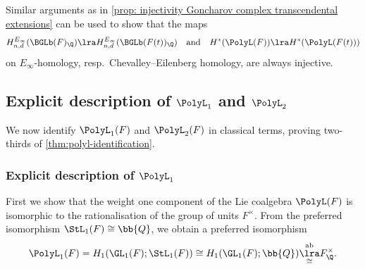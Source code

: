 \documentclass[a4paper]{amsart}
\begin{document}
\begin{remark}
    Similar arguments as in \cref{prop: injectivity Goncharov complex transcendental extensions} can be used to show that the maps
    \[H_{n,d}^{E_\infty}(\BGLb(F)_\Q) \lra H_{n,d}^{E_\infty}(\BGLb(F(t))_\Q) \quad \text{and} \quad H^*(\PolyL(F)) \lra H^*(\PolyL(F(t))) \]
on $E_\infty$-homology, resp.~Chevalley--Eilenberg homology, are always injective.
\end{remark}

\subsection{Explicit description of  $\PolyL_1$ and  $\PolyL_2$}\label{sec: G1 and G_2} We now identify $\PolyL_1(F)$ and $\PolyL_2(F)$ in classical terms, proving two-thirds of \cref{thm:polyl-identification}.

\subsubsection{Explicit description of  $\PolyL_1$}
First we show that the weight one component of the Lie coalgebra $\PolyL(F)$ is isomorphic to the rationalisation of the group of units $F^\times$. From the preferred isomorphism $\StL_1(F) \cong \bb{Q}$, we obtain a preferred isomorphism
\begin{equation}\label{eqn:isomorphism in weight 1}
    \PolyL_1(F) = H_1(\GL_1(F);\StL_1(F))\cong H_1(\GL_1(F);\bb{Q}) \underset{\cong}{\overset{\rm{ab}}\lra} F^{\times}_{\Q}.
\end{equation}
\end{document}
